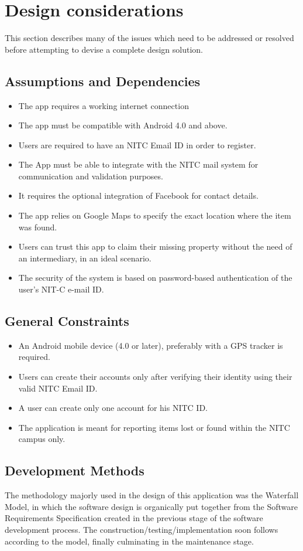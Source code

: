 \documentclass[a4paper,12pt]{article}
\begin{document}
\section{Design considerations}
This section describes many of the issues which need to be addressed or resolved before attempting to devise a complete design solution.
\subsection{Assumptions and Dependencies}
\begin{itemize}
\item The app requires a working internet connection
\item The app must be compatible with Android 4.0 and above.
\item Users are required to have an NITC Email ID in order to register.
\item The App must be able to integrate with the NITC mail system for communication and validation purposes.
\item It requires the optional integration of Facebook for contact details.
\item The app relies on Google Maps to specify the exact location where the item was found.
\item Users can trust this app to claim their missing property without the need of an intermediary, in an ideal scenario. 
\item The security of the system is based on password-based authentication of the user's NIT-C e-mail ID. 
\end{itemize}
\subsection{General Constraints}
\begin{itemize}
\item An Android mobile device (4.0 or later), preferably with a GPS tracker is required. 
\item Users can create their accounts only after verifying their identity using their valid NITC Email ID. 
\item A user can create only one account for his NITC ID. 
\item The application is meant for reporting items lost or found within the NITC campus only.
\end{itemize}
\subsection{Development Methods}
The methodology majorly used in the design of this application was the Waterfall Model, in which the software design is organically put together from the Software Requirements Specification created in the previous stage of the software development process. The construction/testing/implementation soon follows according to the model, finally culminating in the maintenance stage.
\end{document}
